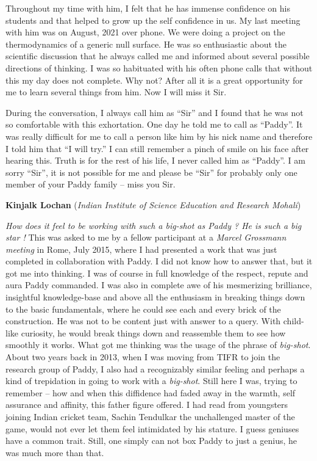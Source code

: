 \documentclass[prd, preprint, longbibliography, 12pt]{revtex4-2}
\begin{document}
Throughout my time with him, I felt that he has immense confidence on his students and that helped to grow up the self confidence in us.  My last meeting with him was on August, 2021 over phone. We were doing a project on the thermodynamics of a generic null surface. He was so enthusiastic  about the scientific discussion that he always called me and informed about several possible directions of thinking. I was so habituated with his often phone calls that without this my day does not complete. Why not? After all it is a great opportunity for me to learn several things from him. Now I will miss it Sir. 

During the conversation, I always call him as ``Sir'' and I found that he was not so comfortable with this exhortation. One day he told me to call as ``Paddy''. It was really difficult for me to call a person like him by his nick name and therefore I told him that ``I will try.'' I can still remember a pinch of smile on his face after hearing this. Truth is for the rest of his life, I never called him as ``Paddy''. I am sorry ``Sir'', it is not possible for me and please be ``Sir'' for probably only one member of your Paddy family -- miss you Sir.



\bigskip
\bigskip

\centerline{{\bf Kinjalk Lochan} ({\it Indian Institute of Science Education and Research Mohali})}
\medskip
{}

\textit{How does it feel to be working with such a big-shot as Paddy ? He is such a big star ! } This  was asked to me by a  fellow participant at a \textit{Marcel Grossmann meeting} in Rome, July 2015,  where I had presented a work that was  just completed in collaboration with Paddy. I did not know how to answer that, but it got me into thinking. I was of course in full knowledge of the respect, repute and aura Paddy commanded. I was also in complete awe of his mesmerizing brilliance, insightful knowledge-base and above all the enthusiasm in breaking things down to the basic fundamentals, where he could see each and every brick of the construction. He was not to be content just with answer to a query. With child-like curiosity, he would break things down and reassemble them to see how smoothly it works. What got me thinking was the usage of the  phrase of \textit{big-shot}. About two years back in 2013, when I was moving from TIFR to join the research group of Paddy, I also had a recognizably similar feeling and perhaps a kind of trepidation in going to work with a \textit{big-shot}.  Still here I was, trying to remember -- how and when this diffidence  had faded away in the warmth, self assurance and affinity, this father figure offered. I had read from youngsters joining Indian cricket team,  Sachin Tendulkar the unchallenged master of the game, would not ever let them feel intimidated by his stature. I guess geniuses have a common trait. Still, one simply can not box Paddy to just a genius, he was much more than that.
\end{document}
